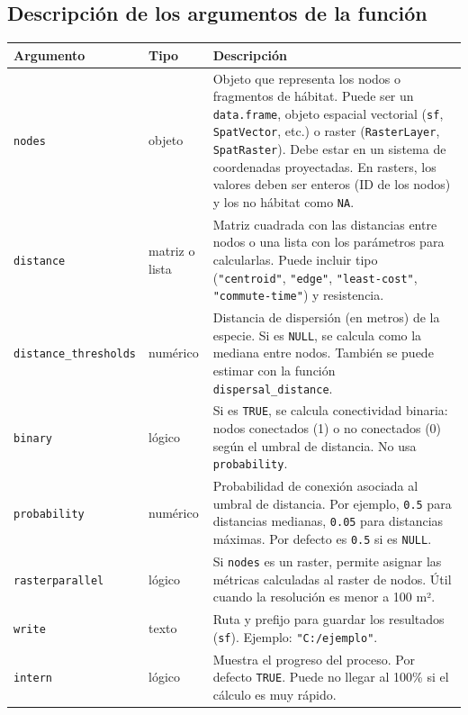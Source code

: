 \documentclass[
]{book}
\begin{document}
\subsection{Descripción de los argumentos de la función}\label{descripciuxf3n-de-los-argumentos-de-la-funciuxf3n}

\begin{longtable}[]{@{}
  >{\raggedright\arraybackslash}p{}
  >{\raggedright\arraybackslash}p{}
  >{\raggedright\arraybackslash}p{}@{}}
\toprule\noalign{}
\begin{minipage}[b]{\linewidth}\raggedright
Argumento
\end{minipage} & \begin{minipage}[b]{\linewidth}\raggedright
Tipo
\end{minipage} & \begin{minipage}[b]{\linewidth}\raggedright
Descripción
\end{minipage} \\
\midrule\noalign{}
\endhead
\bottomrule\noalign{}
\endlastfoot
\texttt{nodes} & objeto & Objeto que representa los nodos o fragmentos de hábitat. Puede ser un \texttt{data.frame}, objeto espacial vectorial (\texttt{sf}, \texttt{SpatVector}, etc.) o raster (\texttt{RasterLayer}, \texttt{SpatRaster}). Debe estar en un sistema de coordenadas proyectadas. En rasters, los valores deben ser enteros (ID de los nodos) y los no hábitat como \texttt{NA}. \\
\texttt{distance} & matriz o lista & Matriz cuadrada con las distancias entre nodos o una lista con los parámetros para calcularlas. Puede incluir tipo (\texttt{"centroid"}, \texttt{"edge"}, \texttt{"least-cost"}, \texttt{"commute-time"}) y resistencia. \\
\texttt{distance\_thresholds} & numérico & Distancia de dispersión (en metros) de la especie. Si es \texttt{NULL}, se calcula como la mediana entre nodos. También se puede estimar con la función \texttt{dispersal\_distance}. \\
\texttt{binary} & lógico & Si es \texttt{TRUE}, se calcula conectividad binaria: nodos conectados (1) o no conectados (0) según el umbral de distancia. No usa \texttt{probability}. \\
\texttt{probability} & numérico & Probabilidad de conexión asociada al umbral de distancia. Por ejemplo, \texttt{0.5} para distancias medianas, \texttt{0.05} para distancias máximas. Por defecto es \texttt{0.5} si es \texttt{NULL}. \\
\texttt{rasterparallel} & lógico & Si \texttt{nodes} es un raster, permite asignar las métricas calculadas al raster de nodos. Útil cuando la resolución es menor a 100 m². \\
\texttt{write} & texto & Ruta y prefijo para guardar los resultados (\texttt{sf}). Ejemplo: \texttt{"C:/ejemplo"}. \\
\texttt{intern} & lógico & Muestra el progreso del proceso. Por defecto \texttt{TRUE}. Puede no llegar al 100\% si el cálculo es muy rápido. \\
\end{longtable}
\end{document}
